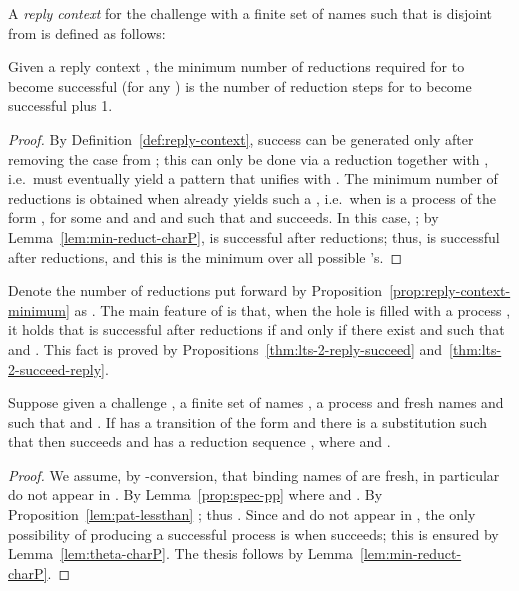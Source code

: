 \documentclass{LMCS}
\begin{document}
\begin{defi}
\label{def:reply-context}
A {\em reply context}  for the challenge  with a finite set of names  such that  is disjoint from  is defined as follows:

\end{defi}

\begin{prop}
\label{prop:reply-context-minimum}
Given a reply context , the minimum number of reductions required for  
to become successful (for any ) is the number of reduction steps for  to become successful plus 1.
\end{prop}
\begin{proof}
By Definition~\ref{def:reply-context}, success can be generated only after removing the case  from ;
this can only be done via a reduction together with , i.e.\  must eventually yield a pattern 
that unifies with . The minimum number of reductions is obtained when  already yields such a , i.e.\ when  is a 
process of the form , for some  and  and  and  such that  and  succeeds. In this case, 
; 
by Lemma~\ref{lem:min-reduct-charP},  is successful after
 reductions; thus,  is successful after  reductions, and this is
the minimum over all possible 's.
\end{proof}

Denote the number of reductions put forward by Proposition~\ref{prop:reply-context-minimum} as .
The main feature of  is that, when the hole is filled with a process , it holds that
 is successful after  reductions if and only if
there exist  and  such that  and .
This fact is proved by Propositions~\ref{thm:lts-2-reply-succeed} and~\ref{thm:lts-2-succeed-reply}.

\begin{prop}
\label{thm:lts-2-reply-succeed}
Suppose given a challenge , a finite set of names , a process  and fresh names  and  such that 
 and .
If  has a transition of the form  and there is a substitution  such that
 then
 succeeds and has a reduction sequence
, where  and .
\end{prop}
\begin{proof}
We assume, by -conversion, that binding names of  are fresh, in particular do not appear in .
By Lemma~\ref{prop:spec-pp}  where  and .
By Proposition~\ref{lem:pat-lessthan} ; thus . Since  and  do not appear in , the only possibility of producing a successful
process is when  succeeds; this is ensured by Lemma~\ref{lem:theta-charP}. The thesis follows by Lemma~\ref{lem:min-reduct-charP}.
\end{proof}
\end{document}
